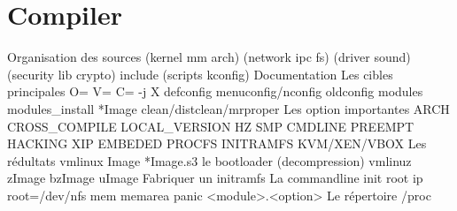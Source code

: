 %
%
%

\part{Compiler}

  Organisation des sources
    (kernel mm arch) (network ipc fs) (driver sound) (security lib crypto) include (scripts kconfig) Documentation
  Les cibles principales
    O=
    V=
    C=
    -j X
    defconfig
    menuconfig/nconfig
    oldconfig
    modules
    modules_install
    *Image
    clean/distclean/mrproper
  Les option importantes
    ARCH
    CROSS_COMPILE
    LOCAL_VERSION
    HZ
    SMP
    CMDLINE
    PREEMPT
    HACKING
    XIP
    EMBEDED
    PROCFS
    INITRAMFS
    KVM/XEN/VBOX
  Les rédultats
    vmlinux  Image *Image.s3
    le bootloader (decompression)
    vmlinuz  zImage bzImage uImage
  Fabriquer un initramfs
  La commandline
    init
    root
    ip
    root=/dev/nfs
    mem
    memarea
    panic
    <module>.<option>
  Le répertoire /proc



